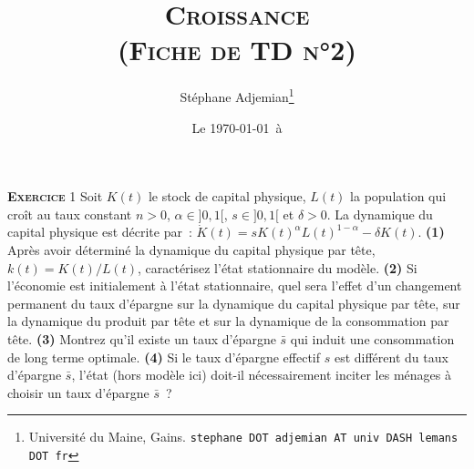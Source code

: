 \documentclass[10pt,a4paper,notitlepage]{article}
\newcommand{\exercice}[1]{\textsc{\textbf{Exercice}} #1}
\newcommand{\question}[1]{\textbf{(#1)}}
\begin{document}
\title{\textsc{Croissance\\ \small{(Fiche de TD n°2)}}}
\author{Stéphane Adjemian\thanks{Université du Maine, Gains. \texttt{stephane DOT adjemian AT univ DASH lemans DOT fr}}}
\date{Le \today\ à \thistime}

\maketitle

\exercice{1}  Soit $K(t)$  le  stock de  capital  physique, $L(t)$  la
population qui  croît au taux  constant $n>0$, $\alpha \in  ]0,1[$, $s
\in  ]0,1[$  et $\delta>0$.   La  dynamique  du capital  physique  est
décrite par :  $\dot{K}(t)=sK(t)^{\alpha}L(t)^{1-\alpha}-\delta K(t)$.
\question{1} Après  avoir déterminé  la dynamique du  capital physique
par  tête,  $k(t)=K(t)/L(t)$,   caractérisez  l'état  stationnaire  du
modèle.  \question{2}   Si  l'économie   est  initialement   à  l'état
stationnaire,  quel sera  l'effet  d'un changement  permanent du  taux
d'épargne  sur la  dynamique  du  capital physique  par  tête, sur  la
dynamique du produit  par tête et sur la dynamique  de la consommation
par  tête.   \question{3}  Montrez  qu'il  existe  un  taux  d'épargne
$\bar{s}$  qui  induit  une   consommation  de  long  terme  optimale.
\question{4} Si le  taux d'épargne effectif $s$ est  différent du taux
d'épargne $\bar{s}$,  l'état (hors modèle ici)  doit-il nécessairement
inciter les ménages à choisir un taux d'épargne $\bar{s}$ ?\newline
\end{document}
